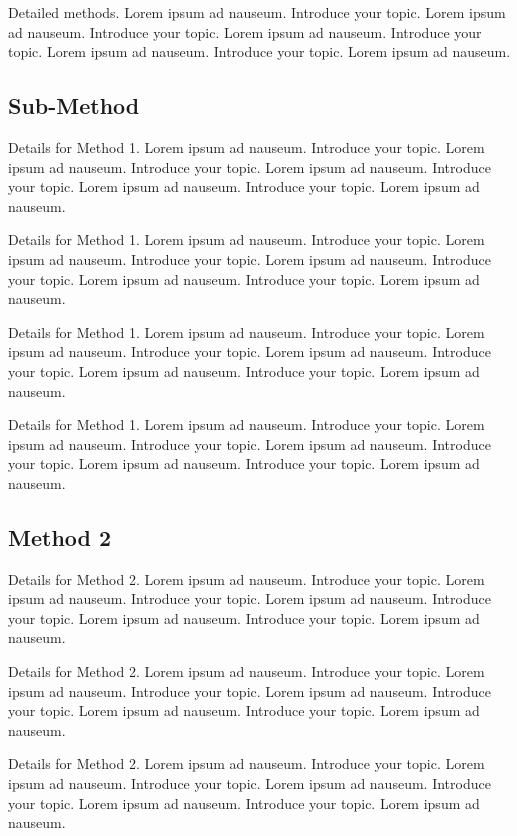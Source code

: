 \documentclass{bioinfo}
\begin{document}
Detailed methods. Lorem ipsum ad nauseum. Introduce your topic. Lorem
ipsum ad nauseum. Introduce your topic. Lorem ipsum ad nauseum.
Introduce your topic. Lorem ipsum ad nauseum. Introduce your topic.
Lorem ipsum ad nauseum.

\subsection{Sub-Method}

Details for Method 1. Lorem ipsum ad nauseum. Introduce your topic.
Lorem ipsum ad nauseum. Introduce your topic. Lorem ipsum ad nauseum.
Introduce your topic. Lorem ipsum ad nauseum. Introduce your topic.
Lorem ipsum ad nauseum.

Details for Method 1. Lorem ipsum ad nauseum. Introduce your topic.
Lorem ipsum ad nauseum. Introduce your topic. Lorem ipsum ad nauseum.
Introduce your topic. Lorem ipsum ad nauseum. Introduce your topic.
Lorem ipsum ad nauseum.

Details for Method 1. Lorem ipsum ad nauseum. Introduce your topic.
Lorem ipsum ad nauseum. Introduce your topic. Lorem ipsum ad nauseum.
Introduce your topic. Lorem ipsum ad nauseum. Introduce your topic.
Lorem ipsum ad nauseum.

Details for Method 1. Lorem ipsum ad nauseum. Introduce your topic.
Lorem ipsum ad nauseum. Introduce your topic. Lorem ipsum ad nauseum.
Introduce your topic. Lorem ipsum ad nauseum. Introduce your topic.
Lorem ipsum ad nauseum.

\subsection{Method 2}

Details for Method 2. Lorem ipsum ad nauseum. Introduce your topic.
Lorem ipsum ad nauseum. Introduce your topic. Lorem ipsum ad nauseum.
Introduce your topic. Lorem ipsum ad nauseum. Introduce your topic.
Lorem ipsum ad nauseum.

Details for Method 2. Lorem ipsum ad nauseum. Introduce your topic.
Lorem ipsum ad nauseum. Introduce your topic. Lorem ipsum ad nauseum.
Introduce your topic. Lorem ipsum ad nauseum. Introduce your topic.
Lorem ipsum ad nauseum.

Details for Method 2. Lorem ipsum ad nauseum. Introduce your topic.
Lorem ipsum ad nauseum. Introduce your topic. Lorem ipsum ad nauseum.
Introduce your topic. Lorem ipsum ad nauseum. Introduce your topic.
Lorem ipsum ad nauseum.
\end{document}
